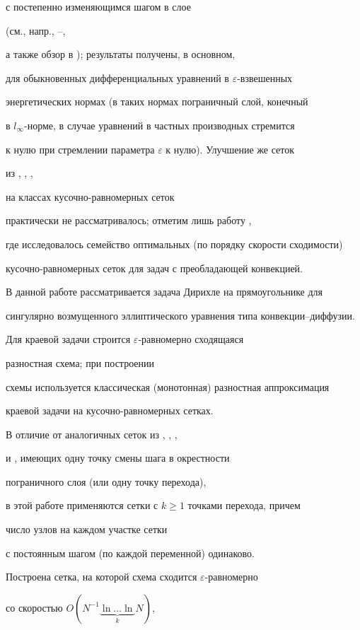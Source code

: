 с постепенно изменяющимся шагом в слое


(см., напр., \cite{13}--\cite{15},


а также обзор в \cite{16}); результаты получены, в основном,


для обыкновенных дифференциальных уравнений в $\varepsilon$-взвешенных 


энергетических нормах (в таких нормах пограничный слой, конечный 


в $l_\infty$-норме, в случае уравнений в частных производных стремится


к нулю при стремлении параметра $\varepsilon$ к нулю). Улучшение же сеток


из \cite{6}, \cite{7}, \cite{CRC}, \cite{12}


на классах кусочно-равномерных сеток


практически не рассматривалось; отметим лишь работу \cite{17},


где исследовалось семейство оптимальных (по порядку скорости сходимости)


кусочно-равномерных сеток для задач с преобладающей конвекцией.





В данной работе рассматривается задача Дирихле на прямоугольнике для 


сингулярно возмущенного эллиптического уравнения типа конвекции--диффузии.


Для краевой задачи строится $\varepsilon$-равномерно сходящаяся


разностная схема; при построении


схемы используется классическая (монотонная) разностная аппроксимация


краевой задачи на кусочно-равномерных сетках.


В отличие от аналогичных сеток из \cite{6}, \cite{7}, \cite{CRC},


\cite{12} и \cite{17}, имеющих одну точку смены шага в окрестности


пограничного слоя (или одну точку перехода),


в этой работе применяются сетки с $k\ge 1$ точками перехода, причем


число узлов на каждом участке сетки


с постоянным шагом (по каждой переменной) одинаково.


Построена сетка, на которой схема сходится $\varepsilon$-равномерно


со скоростью $O(N^{-1}\underbrace{\ln\dotsc \ln}_{k} N)$,


